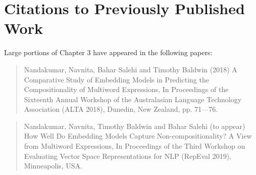 \documentclass[12pt,a4paper]{report}
\begin{document}
\chapter*{\centering \LARGE Citations to Previously Published Work}
Large portions of Chapter 3 have appeared in the following papers:
\begin{quote}
Nandakumar, Navnita, Bahar Salehi and Timothy Baldwin (2018) A Comparative Study of Embedding Models in Predicting the Compositionality of Multiword Expressions, In Proceedings of the Sixteenth Annual Workshop of the Australasian Language Technology Association (ALTA 2018), Dunedin, New Zealand, pp. 71—76.
\end{quote}
\begin{quote}
Nandakumar, Navnita, Timothy Baldwin and Bahar Salehi (to appear) How Well Do Embedding Models Capture Non-compositionality? A View from Multiword Expressions, In Proceedings of the Third Workshop on Evaluating Vector Space Representations for NLP (RepEval 2019), Minneapolis, USA.
\end{quote}
 
\tableofcontents
\listoftables
\listoffigures
\newpage
{}



%




\nocite{*}
\end{document}
